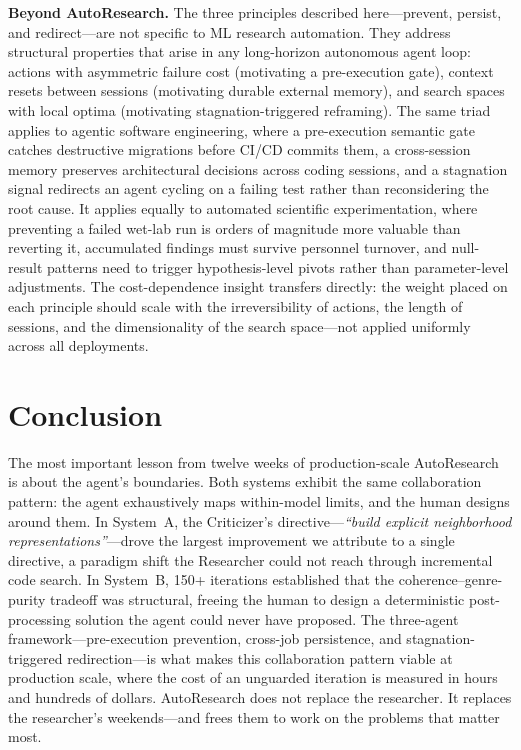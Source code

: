 \documentclass[conference]{IEEEtran}
\begin{document}
\textbf{Beyond AutoResearch.} The three principles described here---prevent, persist, and redirect---are not specific to ML research automation. They address structural properties that arise in any long-horizon autonomous agent loop: actions with asymmetric failure cost (motivating a pre-execution gate), context resets between sessions (motivating durable external memory), and search spaces with local optima (motivating stagnation-triggered reframing). The same triad applies to agentic software engineering, where a pre-execution semantic gate catches destructive migrations before CI/CD commits them, a cross-session memory preserves architectural decisions across coding sessions, and a stagnation signal redirects an agent cycling on a failing test rather than reconsidering the root cause. It applies equally to automated scientific experimentation, where preventing a failed wet-lab run is orders of magnitude more valuable than reverting it, accumulated findings must survive personnel turnover, and null-result patterns need to trigger hypothesis-level pivots rather than parameter-level adjustments. The cost-dependence insight transfers directly: the weight placed on each principle should scale with the irreversibility of actions, the length of sessions, and the dimensionality of the search space---not applied uniformly across all deployments.

\section{Conclusion}

The most important lesson from twelve weeks of production-scale AutoResearch is about the agent's boundaries. Both systems exhibit the same collaboration pattern: the agent exhaustively maps within-model limits, and the human designs around them. In System~A, the Criticizer's directive---\textit{``build explicit neighborhood representations''}---drove the largest improvement we attribute to a single directive, a paradigm shift the Researcher could not reach through incremental code search. In System~B, 150+ iterations established that the coherence--genre-purity tradeoff was structural, freeing the human to design a deterministic post-processing solution the agent could never have proposed. The three-agent framework---pre-execution prevention, cross-job persistence, and stagnation-triggered redirection---is what makes this collaboration pattern viable at production scale, where the cost of an unguarded iteration is measured in hours and hundreds of dollars. AutoResearch does not replace the researcher. It replaces the researcher's weekends---and frees them to work on the problems that matter most.
\end{document}
